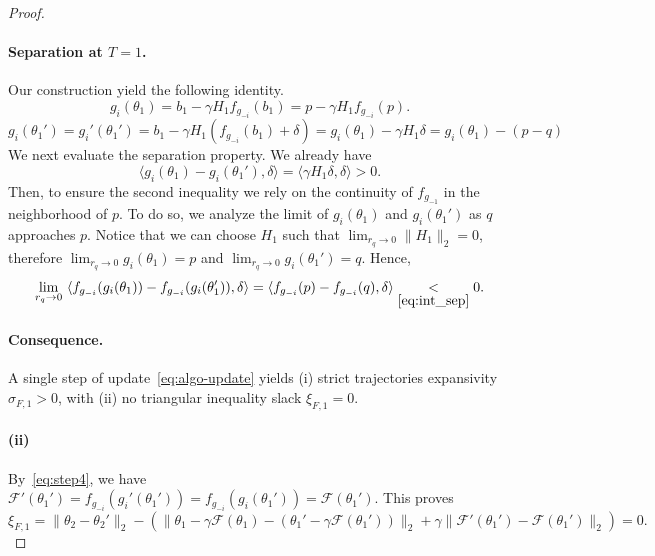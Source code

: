 \documentclass[twoside,11pt]{article}
\newcommand{\F}{\mathcal{F}}
\begin{document}
\begin{proof}
    \paragraph{Separation at $T=1$.} 
    Our construction yield the following identity. 
    \begin{equation}\label{eq:step3}
        g_i(\theta_1) = b_1 - \gamma H_1 f_{g_{-i}}(b_1) = p - \gamma H_1 f_{g_{-i}}(p).
    \end{equation}
    \begin{equation}\label{eq:step4}
        g_i(\theta_1') = g_i'(\theta_1') = b_1 - \gamma H_1 (f_{g_{-i}}(b_1) + \delta) = g_i(\theta_1) - \gamma H_1 \delta = g_i(\theta_1) - (p - q) 
    \end{equation}
    We next evaluate the separation property. 
    We already have
    \begin{equation*}
        \langle g_i(\theta_1) - g_i(\theta_1'), \delta \rangle = \langle \gamma H_1 \delta, \delta \rangle > 0.
    \end{equation*}
    Then, to ensure the second inequality we rely on the continuity of $f_{g_{-1}}$ in the neighborhood of $p$. 
    To do so, we analyze the limit of $g_i(\theta_1)$ and $g_i(\theta_1')$ as $q$ approaches $p$.
    Notice that we can choose $H_1$ such that $\lim_{r_q\to0} \|H_1\|_2 = 0$, therefore $\lim_{r_q\to0}g_i(\theta_1) = p$ and $\lim_{r_q\to0} g_i(\theta_1') = q$.
    Hence, 
    \begin{equation*}
        \lim_{r_q \to 0}\ \langle f_{g_{-i}}(g_i(\theta_1)) - f_{g_{-i}}(g_i(\theta_1')), \delta \rangle = \langle f_{g_{-i}}(p) - f_{g_{-i}}(q), \delta \rangle \underset{\eqref{eq:int_sep}}{<} 0. 
    \end{equation*}

    \paragraph{Consequence.}
    A single step of update~\eqref{eq:algo-update} yields (i) strict trajectories expansivity $\sigma_{F, 1} > 0$, with (ii) no triangular inequality slack $\xi_{F, 1} = 0$. 

    \paragraph{(ii)} By~\eqref{eq:step4}, we have $\mathcal{F}'(\theta_1') = f_{g_{-i}}(g_i'(\theta_1')) = f_{g_{-i}}(g_i(\theta_1')) =  \mathcal{F}(\theta_1')$.
    This proves
    \begin{equation*}
        \xi_{F,1} = \| \theta_{2} - \theta_{2}' \|_2 - \left( \| \theta_1 - \gamma \F(\theta_1) - (\theta_1' - \gamma \F(\theta_1')) \|_2 + \gamma \| \F'(\theta_1') - \F(\theta_1') \|_2 \right) 
        = 0.
    \end{equation*}


\end{proof}
\end{document}
